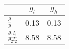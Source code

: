 \begin{tiny}\begin{tabular}{|l|c|c|}
\hline
&\textbf{$g_l$}&\textbf{$g_h$}\\\hline
\textbf{$\frac{g}{y}$}&0.13&0.13\\\hline
\textbf{$\frac{\theta_1 l_1}{\theta_2 l_2}$}&8.58&8.58\\\hline
\end{tabular}
\end{tiny}